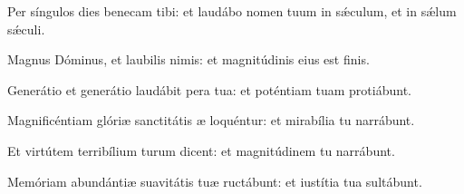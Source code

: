 \item {}

\item Per síngulos dies benecam tibi:\psstar{} et laudábo nomen tuum in sǽculum, et in sǽlum sǽculi.

\item Magnus Dóminus, et laubilis nimis:\psstar{} et magnitúdinis eius  est finis.

\item Generátio et generátio laudábit pera tua:\psstar{} et poténtiam tuam protiábunt.

\item Magnificéntiam glóriæ sanctitátis æ loquéntur:\psstar{} et mirabília tu narrábunt.

\item Et virtútem terribílium turum dicent:\psstar{} et magnitúdinem tu narrábunt.

\item Memóriam abundántiæ suavitátis tuæ ructábunt:\psstar{} et iustítia tua sultábunt.

